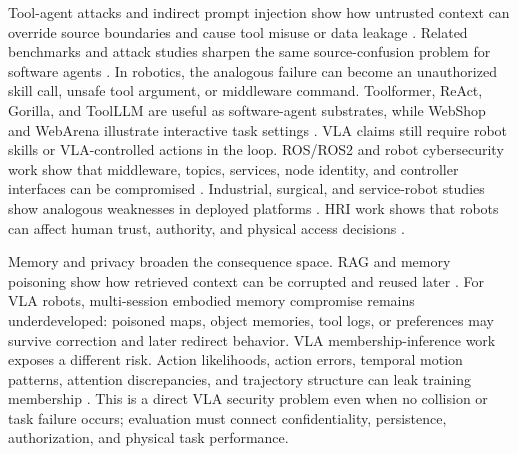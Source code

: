 Tool-agent attacks and indirect prompt injection show how untrusted context can override source boundaries and cause tool misuse or data leakage \cite{greshake2023not,zhan2024injecagent,debenedetti2024agentdojo}. Related benchmarks and attack studies sharpen the same source-confusion problem for software agents \cite{yi2023bipia,ruan2024toolemu}. In robotics, the analogous failure can become an unauthorized skill call, unsafe tool argument, or middleware command. Toolformer, ReAct, Gorilla, and ToolLLM are useful as software-agent substrates, while WebShop and WebArena illustrate interactive task settings \cite{schick2023toolformer,yao2023react,patil2023gorilla,qin2023toolllm,yao2022webshop,zhou2023webarena}. VLA claims still require robot skills or VLA-controlled actions in the loop. ROS/ROS2 and robot cybersecurity work show that middleware, topics, services, node identity, and controller interfaces can be compromised \cite{quigley2009ros,dieber2020penetration,deng2022insecurityros2,neupane2024security,yaacoub2022robotics}. Industrial, surgical, and service-robot studies show analogous weaknesses in deployed platforms \cite{quarta2017industrial,bonaci2015surgical,mayoral2020robot}. HRI work shows that robots can affect human trust, authority, and physical access decisions \cite{booth2017piggybacking,postnikoff2018robot,bainbridge2011benefits,saunderson2021persuasive}.

Memory and privacy broaden the consequence space. RAG and memory poisoning show how retrieved context can be corrupted and reused later \cite{zhong2023poisoning,deng2024pandora,zou2025poisonedrag,cho2024garag}. For VLA robots, multi-session embodied memory compromise remains underdeveloped: poisoned maps, object memories, tool logs, or preferences may survive correction and later redirect behavior. VLA membership-inference work exposes a different risk. Action likelihoods, action errors, temporal motion patterns, attention discrepancies, and trajectory structure can leak training membership \cite{peng2026miavla,luan2026vlaleaks}. This is a direct VLA security problem even when no collision or task failure occurs; evaluation must connect confidentiality, persistence, authorization, and physical task performance.
